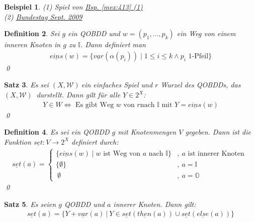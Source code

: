 \documentclass[ngerman]{scrartcl}
\theoremstyle{custom}
\newtheorem{mdef}{Definition} \numberwithin{mdef}{subsection}
\newtheorem{mex}[mdef]{Beispiel}
\newtheorem{ms}[mdef]{Satz}
\newcommand{\0}{\mathbf{0}}
\newcommand{\1}{\mathbf{L}}
\newcommand{\then}{\underline{then}}
\newcommand{\el}{\underline{else}}
\newcommand{\var}{\underline{var}}
\newcommand{\eins}{\underline{eins}}
\newcommand{\set}{\underline{set}}
\newcommand{\sg}{$(X,\mathcal{W})~$}
\begin{document}
\begin{mex}
(1) Spiel von \hyperref[mex:413]{Bsp. \ref{mex:413} (1)}\\
(2) \hyperref[mex:413]{Bundestag Sept. 2009}
\end{mex}

\begin{mdef}
Sei $g$ ein QOBDD und $w = (p_1, \dots, p_k)$ ein Weg von einem
inneren Knoten in $g$ zu $\mathds{I}$. Dann definiert man
\begin{align*}
\underline{eins}(w) = \{\var(\alpha(p_i)) \mid 1 \leq i \leq k \wedge
p_i \text{ 1-Pfeil}\}
\end{align*}
\qed
\end{mdef}

\begin{ms}
Es sei \sg ein einfaches Spiel und $r$ Wurzel des QOBDDs, das \sg
darstellt. Dann gilt f\"ur alle $Y \in 2^X$:
\begin{align*}
Y \in W \Leftrightarrow \text{ Es gibt Weg } w \text{ von } r \text{
  nach } \mathds{I} \text{ mit } Y = \underline{eins}(w)
\end{align*}
\qed
\end{ms}

\begin{mdef}
Es sei ein QOBDD $g$ mit Knotenmengen $V$ gegeben. Dann ist die
Funktion $\underline{set}:V \rightarrow 2^X$ definiert durch:
\begin{align*}
  \set(a) = \begin{cases} \{\eins(w) \mid w \text{ ist Weg von } a
    \text{ nach } \mathds{I} \} &,~ a \text{ ist innerer Knoten }\\
    \{\emptyset\} &,~ a = \mathds{I}\\
    ~\emptyset &,~ a = \mathds{O}
  \end{cases}
\end{align*}
\qed
\end{mdef}

\begin{ms}
Es seien $g$ QOBDD und $a$ innerer Knoten. Dann gilt:
\begin{align*}
\set(a) = \{Y+\var(a) ~\vert~ Y \in \set(\then(a)) \cup \set(\el(a))\}
\end{align*}
\end{ms}
\end{document}
